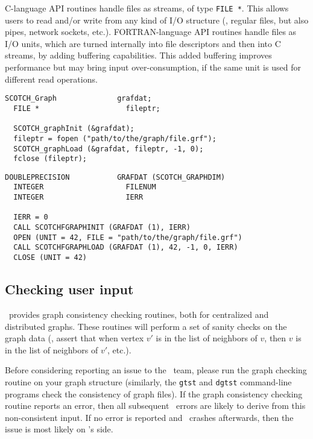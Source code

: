 \textsc{C}-language API routines handle files as streams, of type
\texttt{FILE~*}. This allows users to read and/or write from any kind
of I/O structure (\eg, regular files, but also pipes, network sockets,
etc.). \textsc{FORTRAN}-language API routines handle files as I/O
units, which are turned internally into file descriptors and then
into \textsc{C} streams, by adding buffering capabilities. This added
buffering improves performance but may bring input over-consumption,
if the same unit is used for different read operations.

\begin{lstlisting}[style=language-c]
  SCOTCH_Graph              grafdat;
  FILE *                    fileptr;

  SCOTCH_graphInit (&grafdat);
  fileptr = fopen ("path/to/the/graph/file.grf");
  SCOTCH_graphLoad (&grafdat, fileptr, -1, 0);
  fclose (fileptr);
\end{lstlisting}

\begin{lstlisting}[style=language-f]
  DOUBLEPRECISION           GRAFDAT (SCOTCH_GRAPHDIM)
  INTEGER                   FILENUM
  INTEGER                   IERR

  IERR = 0
  CALL SCOTCHFGRAPHINIT (GRAFDAT (1), IERR)
  OPEN (UNIT = 42, FILE = "path/to/the/graph/file.grf")
  CALL SCOTCHFGRAPHLOAD (GRAFDAT (1), 42, -1, 0, IERR)
  CLOSE (UNIT = 42)
\end{lstlisting}

\subsection{Checking user input}

\scotch\ provides graph consistency checking routines, both for
centralized and distributed graphs. These routines will perform a set
of sanity checks on the graph data (\eg, assert that when vertex $v'$
is in the list of neighbors of $v$, then $v$ is in the list of
neighbors of $v'$, etc.).

Before considering reporting an issue to the \scotch\ team, please run
the graph checking routine on your graph structure (similarly, the
\texttt{gtst} and \texttt{dgtst} command-line programs check the
consistency of graph files). If the graph consistency checking routine
reports an error, then all subsequent \scotch\ errors are likely to
derive from this non-consistent input. If no error is reported and
\scotch\ crashes afterwards, then the issue is most likely on
\scotch's side.

